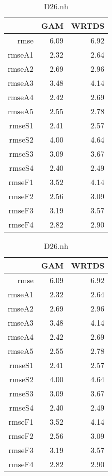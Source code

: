 \documentclass[12pt]{amsart}
\begin{document}
\begin{table}[H]
\centering
\begin{tabular}{rrr}
  \hline
 & GAM & WRTDS \\ 
  \hline
rmse & 6.09 & 6.92 \\ 
  rmseA1 & 2.32 & 2.64 \\ 
  rmseA2 & 2.69 & 2.96 \\ 
  rmseA3 & 3.48 & 4.14 \\ 
  rmseA4 & 2.42 & 2.69 \\ 
  rmseA5 & 2.55 & 2.78 \\ 
  rmseS1 & 2.41 & 2.57 \\ 
  rmseS2 & 4.00 & 4.64 \\ 
  rmseS3 & 3.09 & 3.67 \\ 
  rmseS4 & 2.40 & 2.49 \\ 
  rmseF1 & 3.52 & 4.14 \\ 
  rmseF2 & 2.56 & 3.09 \\ 
  rmseF3 & 3.19 & 3.57 \\ 
  rmseF4 & 2.82 & 2.90 \\ 
   \hline
\end{tabular}
\caption{D26.nh}
\end{table}

\begin{table}[H]
\centering
\begin{tabular}{rrr}
  \hline
 & GAM & WRTDS \\ 
  \hline
rmse & 6.09 & 6.92 \\ 
  rmseA1 & 2.32 & 2.64 \\ 
  rmseA2 & 2.69 & 2.96 \\ 
  rmseA3 & 3.48 & 4.14 \\ 
  rmseA4 & 2.42 & 2.69 \\ 
  rmseA5 & 2.55 & 2.78 \\ 
  rmseS1 & 2.41 & 2.57 \\ 
  rmseS2 & 4.00 & 4.64 \\ 
  rmseS3 & 3.09 & 3.67 \\ 
  rmseS4 & 2.40 & 2.49 \\ 
  rmseF1 & 3.52 & 4.14 \\ 
  rmseF2 & 2.56 & 3.09 \\ 
  rmseF3 & 3.19 & 3.57 \\ 
  rmseF4 & 2.82 & 2.90 \\ 
   \hline
\end{tabular}
\caption{D26.nh}
\end{table}
\end{document}
